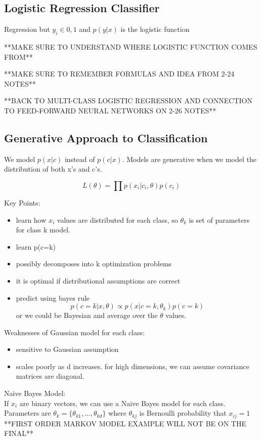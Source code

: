 \documentclass[11pt,psfig]{article}
\begin{document}
\subsection*{Logistic Regression Classifier}

Regression but $y_i \in {0,1}$ and $p(y|x)$ is the logistic function

**MAKE SURE TO UNDERSTAND WHERE LOGISTIC FUNCTION COMES FROM**

**MAKE SURE TO REMEMBER FORMULAS AND IDEA FROM 2-24 NOTES**

**BACK TO MULTI-CLASS LOGISTIC REGRESSION AND CONNECTION TO FEED-FORWARD NEURAL NETWORKS ON 2-26 NOTES**

\subsection*{Generative Approach to Classification}

We model $p(x|c)$ instead of $p(c|x)$. Models are generative when we model the distribution of both x's and c's. 

\[
L(\theta) = \prod{p(x_i|c_i,\theta)p(c_i)}
\]

Key Points:
\begin{itemize}
\item learn how $x_i$ values are distributed for each class, so $\theta_k$ is set of parameters for class k model.
\item learn p(c=k)
\item possibly decomposes into k optimization problems
\item it is optimal if distributional assumptions are correct
\item predict using bayes rule\[
p(c=k|x,\theta)\propto p(x|c=k,\theta_k)p(c=k)
\]  or we could be Bayesian and average over the $\theta$ values. 
\end{itemize}

Weaknesses of Gaussian model for each class:
\begin{itemize}
\item sensitive to Gaussian assumption
\item scales poorly as d increases. for high dimensions, we can assume covariance matrices are diagonal. 
\end{itemize}

Naive Bayes Model:
\\
If $x_i$ are binary vectors, we can use a Naive Bayes model for each class. Parameters are $\theta_k = \{\theta_{k1},...,\theta_{kd}\}$ where $\theta_{kj}$ is Bernoulli probability that $x_{ij}=1$
\\
**FIRST ORDER MARKOV MODEL EXAMPLE WILL NOT BE ON THE FINAL**
\end{document}
